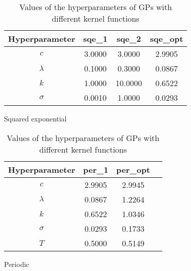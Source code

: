\begin{table}
    \centering
    \begin{subtable}[t]{0.45\textwidth}
        \centering
        \begin{tabular}[t]{|c|c|c|c|}
            \hline
            Hyperparameter & sqe\_1 & sqe\_2 & sqe\_opt \\
            \hline
            $c$ & 3.0000 & 3.0000 & 2.9905 \\
            $\lambda$ & 0.1000 & 0.3000 & 0.0867 \\
            $k$ & 1.0000 & 10.0000 & 0.6522 \\
            $\sigma$ & 0.0010 & 1.0000 & 0.0293 \\
            \hline
        \end{tabular}
        \caption{Squared exponential}
        \label{table:sqe hyperparameters}
    \end{subtable}
    \begin{subtable}[t]{0.45\textwidth}
        \centering
        \begin{tabular}[t]{|c|c|c|c|}
            \hline
            Hyperparameter & per\_1 & per\_opt \\
            \hline
            $c$ & 2.9905 & 2.9945 \\
            $\lambda$ & 0.0867 & 1.2264 \\
            $k$ & 0.6522 & 1.0346 \\
            $\sigma$ & 0.0293 & 0.1733 \\
            $T$ & 0.5000 & 0.5149 \\
            \hline
        \end{tabular}
        \caption{Periodic}
        \label{table:per hyperparameters}
    \end{subtable}
    \caption{Values of the hyperparameters of GPs with different kernel functions}
    \label{table:hyperparameters}
\end{table}
